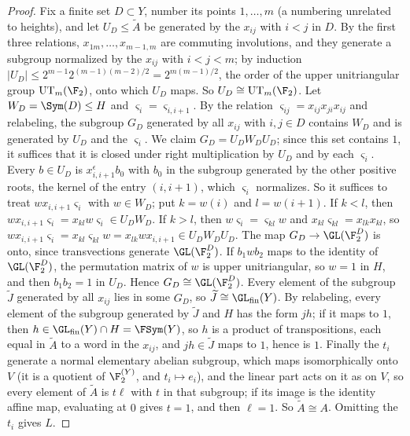 \begin{proof}
Fix a finite set $D\subset Y$, number its points $1,\dots,m$ (a numbering unrelated to heights), and let $U_D\le\widetilde A$ be generated by the $x_{ij}$ with $i<j$ in $D$. By the first three
relations, $x_{1m},\dots,x_{m-1,m}$ are commuting involutions, and they generate a subgroup normalized by the $x_{ij}$ with $i<j<m$; by induction
$|U_D|\le2^{m-1}2^{(m-1)(m-2)/2}=2^{m(m-1)/2}$, the order of the upper unitriangular group $\mathrm{UT}_m(\F_2)$, onto which $U_D$ maps. So
$U_D\cong\mathrm{UT}_m(\F_2)$. Let $W_D=\Sym(D)\le H$ and $\varsigma_i=\varsigma_{i,i+1}$. By the relation $\varsigma_{ij}=x_{ij}x_{ji}x_{ij}$ and relabeling, the
subgroup $G_D$ generated by all $x_{ij}$ with $i,j\in D$ contains $W_D$ and is generated by $U_D$ and the $\varsigma_i$. We claim $G_D=U_DW_DU_D$; since this
set contains $1$, it suffices that it is closed under right multiplication by $U_D$ and by each $\varsigma_i$. Every $b\in U_D$ is $x_{i,i+1}^\epsilon b_0$ with
$b_0$ in the subgroup generated by the other positive roots, the kernel of the entry $(i,i+1)$, which $\varsigma_i$ normalizes. So it suffices
to treat $wx_{i,i+1}\varsigma_i$ with $w\in W_D$; put $k=w(i)$ and $l=w(i+1)$. If $k<l$, then $wx_{i,i+1}\varsigma_i=x_{kl}w\varsigma_i\in U_DW_D$. If
$k>l$, then $w\varsigma_i=\varsigma_{kl}w$ and $x_{kl}\varsigma_{kl}=x_{lk}x_{kl}$, so $wx_{i,i+1}\varsigma_i=x_{kl}\varsigma_{kl}w=x_{lk}wx_{i,i+1}\in U_DW_DU_D$. The map $G_D\to\GL(\F_2^D)$ is onto, since transvections generate $\GL(\F_2^D)$. If $b_1wb_2$ maps to the identity of $\GL(\F_2^D)$, the permutation matrix of $w$
is upper unitriangular, so $w=1$ in $H$, and then $b_1b_2=1$ in $U_D$. Hence $G_D\cong\GL(\F_2^D)$. Every element of the subgroup $\widetilde J$
generated by all $x_{ij}$ lies in some $G_D$, so $\widetilde J\cong\GL_{\rm fin}(Y)$. By relabeling, every element of the subgroup generated by
$\widetilde J$ and $H$ has the form $jh$; if it maps to $1$, then $h\in\GL_{\rm fin}(Y)\cap H=\FSym(Y)$, so $h$ is a product of transpositions, each
equal in $\widetilde A$ to a word in the $x_{ij}$, and $jh\in\widetilde J$ maps to $1$, hence is $1$. Finally the $t_i$ generate a normal elementary
abelian subgroup, which maps isomorphically onto $V$ (it is a quotient of $\F_2^{(Y)}$, and $t_i\mapsto e_i$), and the linear part acts on it as on $V$, so every element of $\widetilde A$ is $t\ell$ with $t$ in that subgroup; if its image is
the identity affine map, evaluating at $0$ gives $t=1$, and then $\ell=1$. So $\widetilde A\cong A$. Omitting the $t_i$ gives $L$.


\end{proof}
